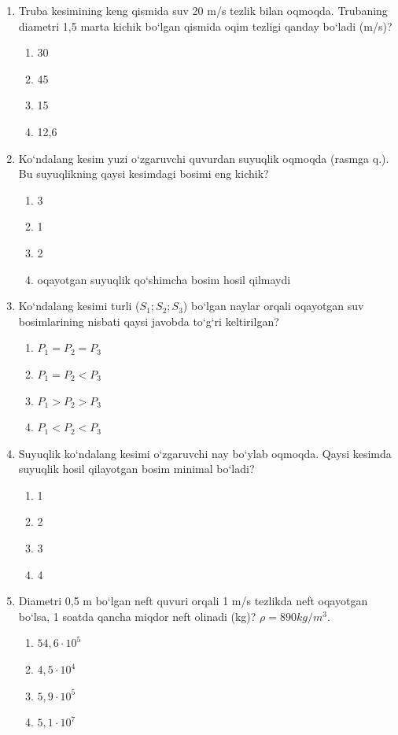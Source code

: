 \begin{enumerate}
\item Truba kesimining keng qismida suv 20 m/s tezlik bilan oqmoqda. Trubaning diametri 1,5 marta kichik bo‘lgan qismida oqim tezligi qanday bo‘ladi (m/s)?
\begin{enumerate}[label=\Alph*)]
\item 30
\item 45
\item 15
\item 12,6
\end{enumerate}

\item Ko‘ndalang kesim yuzi o‘zgaruvchi quvurdan suyuqlik oqmoqda (rasmga q.). Bu suyuqlikning qaysi kesimdagi bosimi eng kichik?
\begin{enumerate}[label=\Alph*)]
\item 3
\item 1
\item 2
\item oqayotgan suyuqlik qo‘shimcha bosim hosil qilmaydi
\end{enumerate}

\item Ko‘ndalang kesimi turli ($S_1; S_2; S_3$) bo‘lgan naylar orqali oqayotgan suv bosimlarining nisbati qaysi javobda to‘g‘ri keltirilgan?
\begin{enumerate}[label=\Alph*)]
\item $P_1 = P_2 = P_3$
\item $P_1 = P_2 < P_3$
\item $P_1 > P_2 > P_3$
\item $P_1 < P_2 < P_3$
\end{enumerate}

\item Suyuqlik ko‘ndalang kesimi o‘zgaruvchi nay bo‘ylab oqmoqda. Qaysi kesimda suyuqlik hosil qilayotgan bosim minimal bo‘ladi?
\begin{enumerate}[label=\Alph*)]
\item 1
\item 2
\item 3
\item 4
\end{enumerate}

\item Diametri 0,5 m bo‘lgan neft quvuri orqali 1 m/s tezlikda neft oqayotgan bo‘lsa, 1 soatda qancha miqdor neft olinadi (kg)? $\rho = 890 kg/m^3$.
\begin{enumerate}[label=\Alph*)]
\item $54,6 \cdot 10^5$
\item $4,5 \cdot 10^4$
\item $5,9 \cdot 10^5$
\item $5,1 \cdot 10^7$
\end{enumerate}


\end{enumerate}

